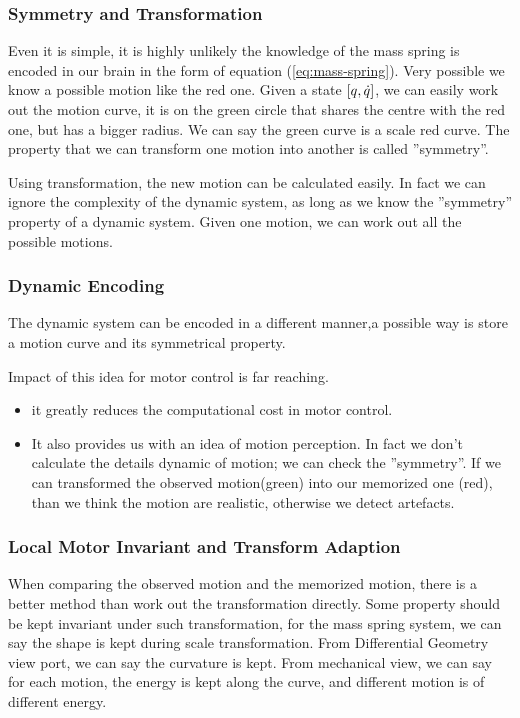 \subsubsection*{Symmetry and Transformation}
Even it is simple, it is highly unlikely the knowledge of the mass spring is encoded in our brain in the form of equation (\ref{eq:mass-spring}).
Very possible we know a possible motion like the red one.
 Given a state $[q,\dot{q}]$, we can easily work out the motion curve, it is on the green circle that shares the centre with the red one, but has a bigger radius.
 We can say the green curve is a scale red curve.
 The property that we can transform one motion into another is called ''symmetry''.

Using transformation, the new motion can be calculated easily.
In fact we can ignore the complexity of the dynamic system, as long as we know the ''symmetry'' property of a dynamic system. 
Given one motion, we can work out all the possible motions.

\subsubsection*{Dynamic Encoding}

The dynamic system can be encoded in a different manner,a possible way is store a motion curve and its symmetrical property.

Impact of this idea for motor control is far reaching. 
\begin{itemize}
\item it greatly reduces the computational cost in motor control.
\item It also provides us with an idea of motion perception. 
In fact we don’t calculate the details dynamic of motion; we can check the ''symmetry''.
If we can transformed the observed motion(green) into our memorized one (red), than we think the motion are realistic, otherwise we detect artefacts.
\end{itemize}

\subsubsection*{Local Motor Invariant and Transform Adaption}
When comparing the observed motion and the memorized motion, there is a better method than work out the transformation directly. 
Some property should be kept invariant under such transformation, for the mass spring system, we can say the shape is kept during scale transformation. 
From Differential Geometry view port, we can say the curvature is kept. 
From mechanical view, we can say for each motion, the energy is kept along the curve, and different motion is of different energy. 

